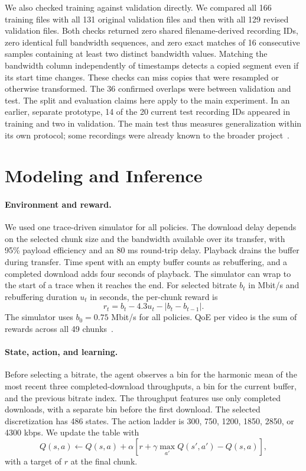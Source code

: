 \documentclass[10pt,letterpaper]{article}
\begin{document}
We also checked training against validation directly. We compared all 166
training files with all 131 original validation files and then with all 129
revised validation files. Both checks returned zero shared filename-derived
recording IDs, zero identical full bandwidth sequences, and zero exact
matches of 16 consecutive samples containing at least two distinct bandwidth
values. Matching the bandwidth column independently of timestamps detects a
copied segment even if its start time changes. These checks can miss copies
that were resampled or otherwise transformed. The 36 confirmed overlaps
were between validation and test. The split and evaluation claims here apply
to the main experiment. In an earlier, separate prototype, 14 of the 20
current test recording IDs appeared in training and two in validation.
The main test thus measures generalization within its own protocol;
some recordings were already known to the broader project~\cite{prototype}.

\section{Modeling and Inference}

\paragraph{Environment and reward.}
We used one trace-driven simulator for all policies. The download delay
depends on the selected chunk size and the bandwidth available over its
transfer, with 95\% payload efficiency and an 80 ms round-trip delay. Playback drains the
buffer during transfer. Time spent with an empty buffer counts as
rebuffering, and a completed download adds four seconds of playback. The
simulator can wrap to the start of a trace when it reaches the end. For
selected bitrate \(b_t\) in Mbit/s and rebuffering duration \(u_t\) in seconds,
the per-chunk reward is
\[
r_t=b_t-4.3u_t-\lvert b_t-b_{t-1}\rvert.
\]
The simulator uses \(b_0=0.75\) Mbit/s for all policies. QoE per video is the sum
of rewards across all 49 chunks~\cite{simulator}.

\paragraph{State, action, and learning.}
Before selecting a bitrate, the agent observes a bin for the harmonic mean of
the most recent three completed-download throughputs, a bin for the current
buffer, and the previous bitrate index. The throughput features use only
completed downloads, with a separate bin before the first download. The
selected discretization has 486 states. The action ladder is 300, 750, 1200,
1850, 2850, or 4300 kbps. We update the table with
\[
 Q(s,a)\gets Q(s,a)+\alpha\left[r+\gamma\max_{a'}Q(s',a')-Q(s,a)\right],
\]
with a target of \(r\) at the final chunk.
\end{document}
